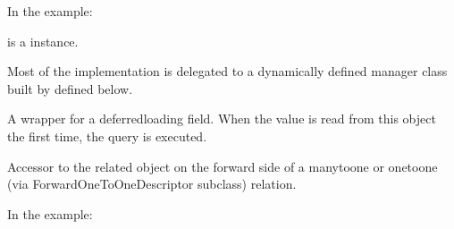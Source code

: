 \documentclass[letterpaper,10pt,english]{sphinxmanual}
\begin{document}
\begin{fulllineitems}
\begin{fulllineitems}
\sphinxAtStartPar
In the example:

\begin{sphinxVerbatim}[commandchars=\\\{\}]
       
\end{sphinxVerbatim}

\sphinxAtStartPar
{} is a  instance.

\sphinxAtStartPar
Most of the implementation is delegated to a dynamically defined manager
class built by  defined below.

\end{fulllineitems}


\begin{fulllineitems}
\label{\detokenize{courses:id1}}
\pysigstartsignatures
\pysigline
{}
\pysigstopsignatures
\sphinxAtStartPar
A wrapper for a deferred\sphinxhyphen{}loading field. When the value is read from this
object the first time, the query is executed.

\end{fulllineitems}


\begin{fulllineitems}
\label{\detokenize{courses:id2}}
\pysigstartsignatures
\pysigline
{}
\pysigstopsignatures
\sphinxAtStartPar
Accessor to the related object on the forward side of a many\sphinxhyphen{}to\sphinxhyphen{}one or
one\sphinxhyphen{}to\sphinxhyphen{}one (via ForwardOneToOneDescriptor subclass) relation.

\sphinxAtStartPar
In the example:

\begin{sphinxVerbatim}[commandchars=\\\{\}]
       
\end{sphinxVerbatim}


\end{fulllineitems}
\end{fulllineitems}
\end{document}
